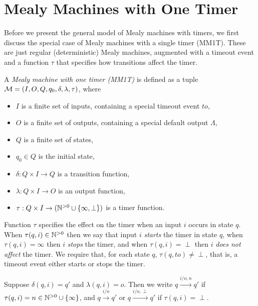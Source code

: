 \section{Mealy Machines with One Timer}

Before we present the general model of Mealy machines with timers, we first discuss the special case of
Mealy machines with a single timer (MM1T). 
These are just regular (deterministic) Mealy machines,
augmented with a timeout event and a function $\tau$ that specifies how transitions affect the timer.

\begin{definition}
\label{MM1T}
A \emph{Mealy machine with one timer (MM1T)} is defined as a tuple ${\cal M} = (I, O, Q, q_0, \delta, \lambda, \tau)$, where
\begin{itemize}
\item
$I$ is a finite set of inputs, containing a special timeout event $\mathit{to}$,
\item
$O$ is a finite set of outputs, containing a special default output $\Lambda$,
\item
$Q$ is a finite set of states,
\item
$q_0 \in Q$ is the initial state,
\item
$\delta: Q \times I \rightarrow Q$ is a transition function, 
\item
$\lambda: Q \times I \rightarrow O$ is an output function, 
\item
$\tau : Q \times I \rightarrow ({\mathbb N}^{>0} \cup \{ \infty, \perp \})$ is a timer function.
\end{itemize}
Function $\tau$ specifies the effect on the timer when an input $i$ occurs in state $q$.
When $\tau(q,i) \in{\mathbb N}^{>0}$ then we say that input $i$ \emph{starts} the timer in state $q$,
when $\tau(q,i) = \infty$ then $i$ \emph{stops} the timer, and
when $\tau(q,i) = \perp$ then $i$ \emph{does not affect} the timer.
We require that, for each state $q$, $\tau(q,\mathit{to}) \neq\perp$, that is, 
a timeout event either starts or stops the timer.

Suppose $\delta(q,i) = q'$ and $\lambda(q,i)= o$.
Then we write $q \xrightarrow{i/o,n} q'$ if $\tau(q,i) =n \in {\mathbb N}^{>0} \cup \{ \infty \}$, 
and $q \xrightarrow{i/o} q'$ or $q \xrightarrow{i/o, \perp} q'$ if $\tau(q,i) = \perp$.
\end{definition}


